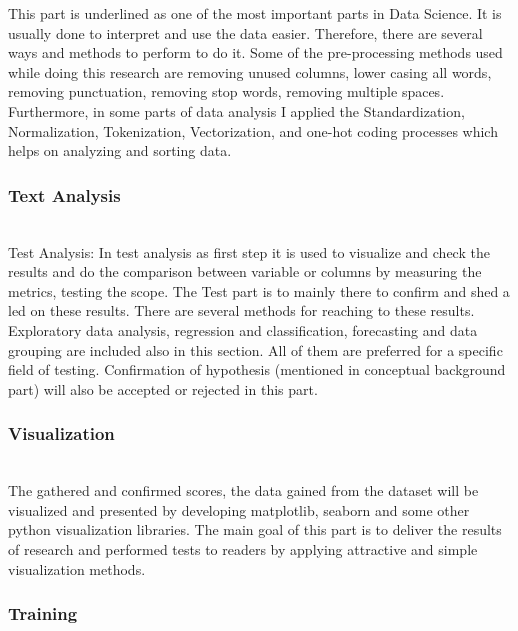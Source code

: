 \documentclass[letterpaper, 10 pt, conference]{ieeeconf}
\begin{document}
This part is underlined as one of the most important parts in Data Science. It is usually done to interpret and use the data easier. Therefore, there are several ways and methods to perform to do it. Some of the pre-processing methods used while doing this research are removing unused columns, lower casing all words, removing punctuation, removing stop words, removing multiple spaces. Furthermore, in some parts of data analysis I applied the Standardization, Normalization, Tokenization, Vectorization, and one-hot coding  processes which helps on analyzing and sorting data.\\

\subsubsection{Text Analysis}\hfill\\

Test Analysis: In test analysis as first step it is used to visualize and check the results and do the comparison between variable or columns by measuring the metrics, testing the scope. The Test part is to mainly there to confirm and shed a led on these results. There are several methods for reaching to these results. Exploratory data analysis, regression and classification, forecasting and data grouping are included also in this section. All of them are preferred for a specific field of testing. Confirmation of hypothesis (mentioned in conceptual background part) will also be accepted or rejected in this part.\\

\subsubsection{Visualization}\hfill\\

The gathered and confirmed scores, the data gained from the dataset will be visualized and presented by developing matplotlib, seaborn and some other python visualization libraries. The main goal of this part is to deliver the results of research and performed tests to readers by applying attractive and simple visualization methods.\\

\subsubsection{Training}\hfill\\
\end{document}
